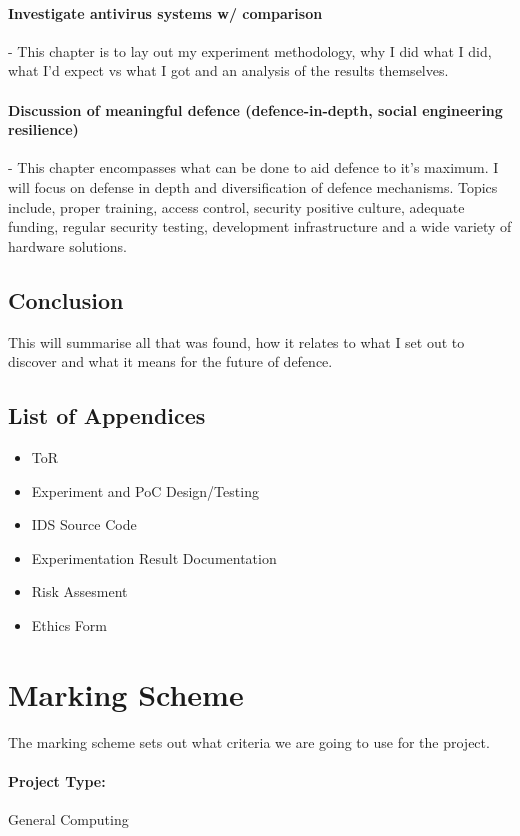 \paragraph{Investigate antivirus systems w/ comparison} - This chapter is to lay out my experiment methodology, why I did what I did, what I'd expect vs what I got and an analysis of the results themselves.

\paragraph{Discussion of meaningful defence (defence-in-depth, social engineering resilience)} - This chapter encompasses what can be done to aid defence to it's maximum. I will focus on defense in depth and diversification of defence mechanisms. 
Topics include, proper training, access control, security positive culture, adequate funding, regular security testing, development infrastructure and a wide variety of hardware solutions.

\subsection{Conclusion} This will summarise all that was found, how it relates to what I set out to discover and what it means for the future of defence. 

\subsection{List of Appendices}
\begin{itemize}
	\item ToR
	\item Experiment and PoC Design/Testing
	\item IDS Source Code
	\item Experimentation Result Documentation
	\item Risk Assesment
	\item Ethics Form
\end{itemize}

\section{Marking Scheme}
The marking scheme sets out what criteria we are going to use for the project.

\paragraph{Project Type:} General Computing

